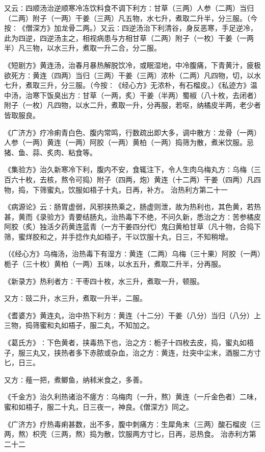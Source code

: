 \documentclass[a4paper,12pt,UTF8,twoside]{ctexbook}
\begin{document}
又云∶四顺汤治逆顺寒冷冻饮料食不调下利方∶甘草（三两）人参（二两）当归（二两）附子（一两）干姜（三两）凡五物，水七升，煮取二升半，分三服。（今按∶《僧深方》加龙骨二两。）又云∶四逆汤治下利清谷，身反恶寒，手足逆冷，此为四逆，四逆汤主之，相视病患与方相甘草（二两）附子（一枚）干姜（一两半）凡三物，以水三升，煮取一升二合，分二服。

《短剧方》黄连汤，治春月暴热解脱饮冷，或眠湿地，中冷腹痛，下青黄汁，疲极欲死方∶黄连（四两）当归（三两）干姜（三两）浓朴（二两）凡四物，切，以水七升，煮取三升，分三服。（今按∶《经心方》无浓朴，有石榴皮。）《私迹方》温中汤，治寒下饭臭出方∶甘草（一两，炙）干姜（半两）蜀椒（八十枚，去闭者）附子（一枚）凡四物，以水二升，煮取一升，分再服，若呕，纳橘皮半两，老少者皆取服良。

《广济方》疗冷痢青白色、腹内常鸣，行数疏出即大多，调中散方∶龙骨（一两）人参（一两）黄连（一两）阿胶（一两）黄柏（一两）捣筛为散，煮米饮服。忌猪、鱼、蒜、炙肉、粘食等。

《集验方》治久新寒冷下利，腹内不安，食辄注下，令人生肉乌梅丸方∶乌梅（三百六十枚，去核，熬令可捣）附子（四两，炮）黄连（十二两）干姜（四两）凡四物，捣，下筛蜜丸，饮服如梧子十丸，日再，补方。
治热利方第二十一

《病源论》云∶肠胃虚弱，风邪挟热乘之，肠虚则泄，故为热利也，其色黄，若热甚，黄而《录验方》青要结肠丸，治热毒下不绝，不问久新，悉治之方∶苦参橘皮阿胶（炙）独活夕药黄连蓝青（一方干姜四分代）鬼臼黄柏甘草（凡十物，合捣下筛，蜜烊胶和之，并手捻作丸如梧子，干以饮服十丸，日三，不知稍增。

（《经心方》乌梅汤，治热毒下有湿方∶黄连（二两）乌梅（三十果）阿胶（一两）栀子（三十枚）黄柏（一两）五味，以水五升，煮取二升半，分再服。

《新录方》热利者方∶干枣四十枚，水三升，煮取一升，顿服。

又方∶豉二升，水三升，煮取一升半，二服。

《耆婆方》黄连丸，治中热下利方∶黄连（十二分）干姜（八分）当归（八分）上三物，捣筛蜜和丸如梧子，服二丸，不知加之。

《葛氏方》∶下色黄者，挟毒热下也，治之方∶栀子十四枚去皮，捣，蜜丸如梧子，服三丸又，挟热者多下赤脓或杂血，治之方∶黄连，灶突中尘末，酒服二方寸匕，日三。

又方∶薤一把，煮鲫鱼，纳秫米食之，多善。

《千金方》治久利热诸治不瘥方∶乌梅肉（一升，熬）黄连（一斤金色者）二味，蜜和如梧子，服二十丸，日三夜一，神良。《僧深方》同之。

《广济方》疗热毒痢甚数，出不多，腹中刺痛方∶生犀角末（三两）酸石榴皮（三两，熬）枳壳（三两，熬）捣为散，饮服两方寸匕，日再，忌热食。
治赤利方第二十二
\end{document}
